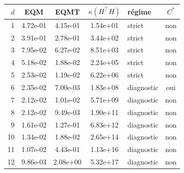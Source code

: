 \begin{tabular}{r S[table-format=1.2e-2] S[table-format=1.2e-2] S[table-format=1.2e-2] l c}
\toprule
{\(d\)} & {EQM} & {EQMT} & {\(\kappa(H^{\top}H)\)} & {r\'egime} & {\(C^{*}\)} \\
 & 4.72e-01 & 4.15e-01 & 1.54e+01 & strict & non \\
2 & 3.91e-01 & 2.78e-01 & 3.44e+02 & strict & non \\
3 & 7.95e-02 & 6.27e-02 & 8.51e+03 & strict & non \\
4 & 5.18e-02 & 1.88e-02 & 2.24e+05 & strict & non \\
5 & 2.53e-02 & 1.19e-02 & 6.22e+06 & strict & non \\
6 & 2.35e-02 & 7.00e-03 & 1.83e+08 & diagnostic & oui \\
7 & 2.12e-02 & 1.01e-02 & 5.71e+09 & diagnostic & non \\
8 & 2.12e-02 & 9.49e-03 & 1.90e+11 & diagnostic & non \\
9 & 1.61e-02 & 1.27e-01 & 6.83e+12 & diagnostic & non \\
10 & 1.34e-02 & 1.88e-02 & 2.65e+14 & diagnostic & non \\
11 & 1.07e-02 & 4.43e-01 & 1.13e+16 & diagnostic & non \\
12 & 9.86e-03 & 2.08e+00 & 5.32e+17 & diagnostic & non \\
\bottomrule
\end{tabular}
